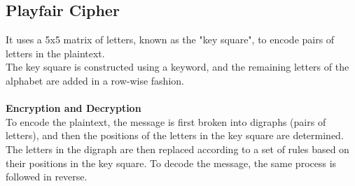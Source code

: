 \documentclass[11pt]{article}
\begin{document}
\subsection*{Playfair Cipher}
It uses a 5x5 matrix of letters, known as the "key square", to encode pairs of letters in the plaintext. \\
The key square is constructed using a keyword, and the remaining letters of the alphabet are added in a row-wise fashion. \\ \\
\textbf{Encryption and Decryption} \\ 
To encode the plaintext, the message is first broken into digraphs (pairs of letters), and then the positions of the letters in the key square are determined. \\
The letters in the digraph are then replaced according to a set of rules based on their positions in the key square. To decode the message, the same process is followed in reverse.
\end{document}
